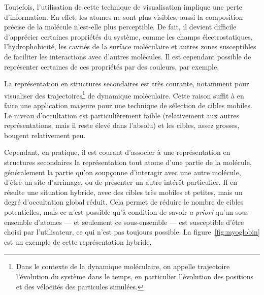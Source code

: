 	Toutefois, l'utilisation de cette technique de visualisation implique une perte d'information. En effet, les atomes ne sont plus visibles, aussi la composition précise de la molécule n'est-elle plus perceptible. De fait, il devient difficile d'apprécier certaines propriétés du système, comme les champs électrostatiques, l'hydrophobicité, les cavités de la surface moléculaire et autres zones susceptibles de faciliter les interactions avec d'autres molécules. Il est cependant possible de représenter certaines de ces propriétés par des couleurs, par exemple.
		
	La représentation en structures secondaires est très courante, notamment pour visualiser des trajectoires\footnote{Dans le contexte de la dynamique moléculaire, on appelle \og trajectoire \fg{} l'évolution du système dans le temps, en particulier l'évolution des positions et des vélocités des particules simulées.} de dynamique moléculaire. Cette raison suffit à en faire une application majeure pour une technique de sélection de cibles mobiles. Le niveau d'occultation est particulièrement faible (relativement aux autres représentations, mais il reste élevé dans l'absolu) et les cibles, assez grosses, bougent relativement peu.
		
	Cependant, en pratique, il est courant d'associer à une représentation en structures secondaires la représentation \og tout atome \fg{} d'une partie de la molécule, généralement la partie qu'on soupçonne d'interagir avec une autre molécule, d'être un site d'arrimage, ou de présenter un autre intérêt particulier. Il en résulte une situation hybride, avec des cibles très mobiles et petites, mais un degré d'occultation global réduit. Cela permet de réduire le nombre de cibles potentielles, mais ce n'est possible qu'à condition de savoir \emph{a priori} qu'un sous-ensemble d'atomes --- et seulement ce sous-ensemble --- est susceptible d'être choisi par l'utilisateur, ce qui n'est pas toujours possible. La figure~\ref{fig:myoglobin} est un exemple de cette représentation hybride.
		
